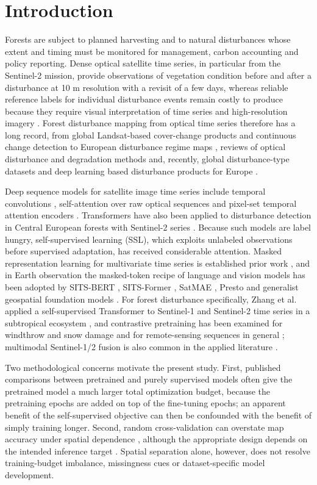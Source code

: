 \documentclass[11pt,a4paper]{article}
\begin{document}
\section{Introduction}
Forests are subject to planned harvesting and to natural disturbances whose extent and timing must be monitored for management, carbon accounting and policy reporting. Dense optical satellite time series, in particular from the Sentinel-2 mission, provide observations of vegetation condition before and after a disturbance at 10 m resolution with a revisit of a few days, whereas reliable reference labels for individual disturbance events remain costly to produce because they require visual interpretation of time series and high-resolution imagery \cite{ref1,ref19}. Forest disturbance mapping from optical time series therefore has a long record, from global Landsat-based cover-change products \cite{ref17} and continuous change detection \cite{ref20} to European disturbance regime maps \cite{ref18}, reviews of optical disturbance and degradation methods \cite{ref19} and, recently, global disturbance-type datasets \cite{ref24} and deep learning based disturbance products for Europe \cite{ref28}.

Deep sequence models for satellite image time series include temporal convolutions \cite{ref11}, self-attention over raw optical sequences \cite{ref12} and pixel-set temporal attention encoders \cite{ref13}. Transformers have also been applied to disturbance detection in Central European forests with Sentinel-2 series \cite{ref27}. Because such models are label hungry, self-supervised learning (SSL), which exploits unlabeled observations before supervised adaptation, has received considerable attention. Masked representation learning for multivariate time series is established prior work \cite{ref3}, and in Earth observation the masked-token recipe of language and vision models \cite{ref14} has been adopted by SITS-BERT \cite{ref9}, SITS-Former \cite{ref10}, SatMAE \cite{ref15}, Presto \cite{ref7} and generalist geospatial foundation models \cite{ref16}. For forest disturbance specifically, Zhang et al. applied a self-supervised Transformer to Sentinel-1 and Sentinel-2 time series in a subtropical ecosystem \cite{ref2}, and contrastive pretraining has been examined for windthrow and snow damage \cite{ref29} and for remote-sensing sequences in general \cite{ref8}; multimodal Sentinel-1/2 fusion is also common in the applied literature \cite{ref25,ref26}.

Two methodological concerns motivate the present study. First, published comparisons between pretrained and purely supervised models often give the pretrained model a much larger total optimization budget, because the pretraining epochs are added on top of the fine-tuning epochs; an apparent benefit of the self-supervised objective can then be confounded with the benefit of simply training longer. Second, random cross-validation can overstate map accuracy under spatial dependence \cite{ref4,ref21,ref22}, although the appropriate design depends on the intended inference target \cite{ref23}. Spatial separation alone, however, does not resolve training-budget imbalance, missingness cues or dataset-specific model development.
\end{document}
